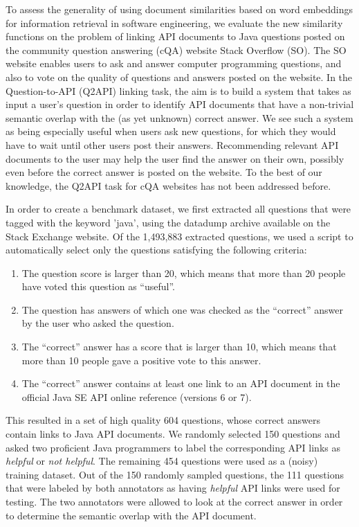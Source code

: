 To assess the generality of using document similarities based on word embeddings for information retrieval in software engineering, we evaluate the new similarity functions on the problem of linking API documents to Java questions posted on the community question answering (cQA) website Stack Overflow (SO). The SO website enables users to ask and answer computer programming questions, and also to vote on the quality of questions and answers posted on the website. In the Question-to-API (Q2API) linking task, the aim is to build a system that takes as input a user's question in order to identify API documents that have a non-trivial semantic overlap with the (as yet unknown) correct answer. We see such a system as being especially useful when users ask new questions, for which they would have to wait until other users post their answers. Recommending relevant API documents to the user may help the user find the answer on their own, possibly even before the correct answer is posted on the website. To the best of our knowledge, the Q2API task for cQA websites has not been addressed before.

In order to create a benchmark dataset, we first extracted all questions that were tagged with the keyword 'java', using the datadump archive available on the Stack Exchange website. Of the 1,493,883 extracted questions, we used a script to automatically select only the questions satisfying the following criteria:
\begin{enumerate}
	\item The question score is larger than 20, which means that more than 20 people have voted this question as ``useful''.
	\item The question has answers of which one was checked as the ``correct'' answer by the user who asked the question.
	\item The ``correct'' answer has a score that is larger than 10, which means that more than 10 people gave a positive vote to this answer.
	\item The ``correct'' answer contains at least one link to an API document in the official Java SE API online reference (versions 6 or 7).
\end{enumerate}
This resulted in a set of high quality 604 questions, whose correct answers contain links to Java API documents. We randomly selected 150 questions and asked two proficient Java programmers to label the corresponding API links as {\it helpful} or {\it not helpful}. The remaining 454 questions were used as a (noisy) training dataset. Out of the 150 randomly sampled questions, the 111 questions that were labeled by both annotators as having {\it helpful} API links were used for testing. The two annotators were allowed to look at the correct answer in order to determine the semantic overlap with the API document.

